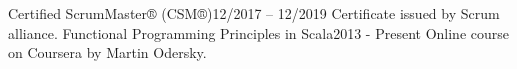 %
%
%

\twocolumnsection
{
    \begin{certifications}
        \certification
    	    {Certified ScrumMaster® (CSM®)}{12/2017 – 12/2019}
    	    {}
    	    {Certificate issued by Scrum alliance.}
        \certification
    	    {Functional Programming Principles in Scala}{2013 - Present}
    	    {}
    	    {Online course on Coursera by Martin Odersky.}
    \end{certifications}
}
{
    \begin{skills}
    \end{skills}
}